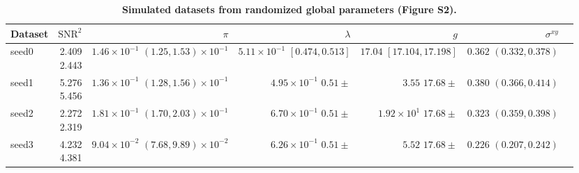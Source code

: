 \begin{table}
\caption{\label{tab:example} \textbf{Simulated datasets from randomized global parameters (Figure S2).}}
\begin{tabular}{lrrrrrr}
\toprule
Dataset &  $\textrm{SNR}^2$ &  $\pi$ &  $\lambda$ &  $g$ &  $\sigma^{xy}$ \\
\midrule
\specialcell{seed0\\\vphantom{fg}}  &  \specialcell{2.409\\2.443}  &   \specialcell{$1.46 \times 10^{-1}$\\$(1.25, 1.53) \times 10^{-1}$}  &  \specialcell{$5.11 \times 10^{-1}$\\$[0.474, 0.513]$} & \specialcell{$17.04$\\$[17.104, 17.198]$}  &  \specialcell{$0.362$\\$(0.332, 0.378)$} \\
\midrule
\specialcell{seed1\\\vphantom{fg}}  & \specialcell{5.276\\5.456} &       \specialcell{$1.36 \times 10^{-1}$\\$(1.28, 1.56) \times 10^{-1}$}  &  \specialcell{$4.95 \times 10^{-1}$\\ $0.51 \pm$}  &  \specialcell{$3.55$ \\ $17.68 \pm$}  &  \specialcell{$0.380$ \\ $(0.366, 0.414)$} \\
\midrule
\specialcell{seed2\\\vphantom{fg}}  & \specialcell{2.272\\2.319} &       \specialcell{$1.81 \times 10^{-1}$\\$(1.70, 2.03) \times 10^{-1}$}  &  \specialcell{$6.70 \times 10^{-1}$\\ $0.51 \pm$}  &  \specialcell{$1.92 \times 10^{1}$ \\ $17.68 \pm$}  &  \specialcell{$0.323$ \\ $(0.359, 0.398)$} \\
\midrule
\specialcell{seed3\\\vphantom{fg}}  & \specialcell{4.232\\4.381} &       \specialcell{$9.04 \times 10^{-2}$\\$(7.68, 9.89) \times 10^{-2}$}  &  \specialcell{$6.26 \times 10^{-1}$\\ $0.51 \pm$}  &  \specialcell{$5.52$ \\ $17.68 \pm$}  &  \specialcell{$0.226$ \\ $(0.207, 0.242)$} \\

\end{tabular}
\end{table}

